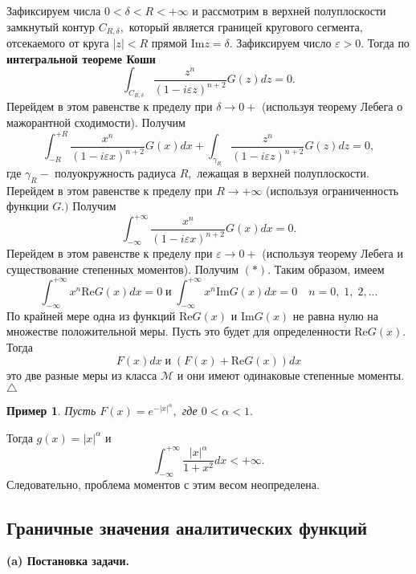\documentclass[12pt,a4paper]{article}
\theoremstyle{plain}   \newtheorem{Pro}{Задача}
\newtheorem{Exa}{Пример}
\begin{document}
Зафиксируем числа
$ 0<\delta <R<+\infty $
и рассмотрим в верхней полуплоскости замкнутый контур
$ C_{R, \delta} , $
который является границей кругового сегмента,
отсекаемого от круга
$ |z|<R $
прямой
$ \mathrm {Im}z=\delta . $
Зафиксируем число
$ \varepsilon >0. $
Тогда по
{\bfseries интегральной теореме Коши}
$$
  \int _{C_{R,\delta}}
  \frac{z^n}{(1-i\varepsilon z)^{n+2}}G(z)dz=0.
$$
Перейдем в этом равенстве к пределу при
$ \delta \rightarrow 0+ $
(используя теорему Лебега о мажорантной сходимости). Получим
$$
  \int _{-R}^{+R} \frac{x^n}{(1-i\varepsilon x)^{n+2}}G(x)dx+
  \int _{\gamma _R} \frac{z^n}{(1-i\varepsilon z)^{n+2}}
  G(z)dz=0,
$$
где
$ \gamma _R - $
полуокружность радиуса
$ R , $
лежащая в верхней полуплоскости. Перейдем в этом равенстве к пределу
при
$ R \rightarrow +\infty $
(используя ограниченность функции
$ G . ) $
Получим
$$
  \int _{-\infty}^{+\infty}
  \frac{x^n}{(1-i\varepsilon x)^{n+2}}G(x)dx=0.
$$
Перейдем в этом равенстве к пределу при
$ \varepsilon \rightarrow 0+ $
(используя теорему Лебега и существование степенных моментов).
Получим
$ (\ast ) . $
Таким образом, имеем
$$
  \int _{-\infty}^{+\infty}x^n \mathrm{Re}G(x)dx=0 \; и \;
  \int _{-\infty}^{+\infty}x^n \mathrm{Im}G(x)dx=0
  \quad n=0, \; 1, \; 2,...
$$
По крайней мере одна из функций
$ \mathrm{Re}G(x) $
и
$ \mathrm{Im}G(x) $
не равна нулю на множестве положительной меры. Пусть это будет
для определенности
$ \mathrm{Re}G(x) . $
Тогда
$$
  F(x)dx \; и \; (F(x)+\mathrm{Re}G(x))dx
$$
это две разные меры из класса
$ \mathcal{M} $
и они имеют одинаковые степенные моменты.
\\
$ \triangle $
\begin{Exa}
Пусть
$ F(x)=e^{-|x|^{\alpha}} , $
где
$ 0<\alpha <1. $
\end{Exa}
Тогда
$ g(x)=|x|^{\alpha} $
и
$$
  \int _{-\infty}^{+\infty}
  \frac{|x|^{\alpha}}{1+x^2}dx<+\infty .
$$
Следовательно, проблема моментов с этим весом неопределена.
\newpage
\subsection{Граничные значения аналитических функций}
{\bfseries (a) Постановка задачи.}  \\
\end{document}
